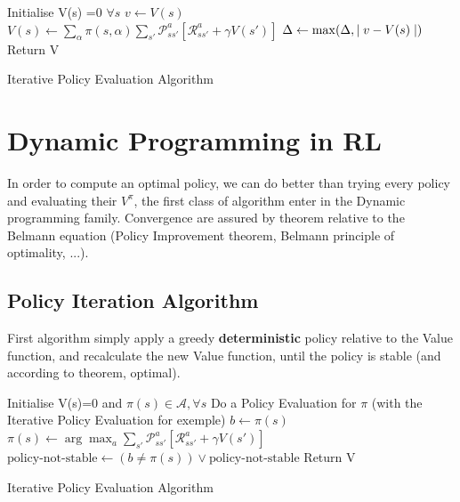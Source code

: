 		\begin{algorithm}[H]
				Initialise V(s) =0 $\forall s$ \;
				{
					{
						$v \leftarrow V(s)$ \;
						$V(s) \leftarrow \sum_\alpha \pi(s, \alpha) \sum_{s'} \mathcal{P}^a_{ss'}[\mathcal{R}^a_{ss'} + \gamma V(s')]$ \;
						$\Delta \leftarrow \max(\Delta, \mid v - V(s)\mid) $ 
					}
				}
				Return V
				\caption{Iterative Policy Evaluation Algorithm}
			\end{algorithm}


\section{Dynamic Programming in RL} %
	\label{sec:dynamic_programming_in_rl}

	In order to compute an optimal policy, we can do better than trying every policy and evaluating their $V^{\pi}$, the first class of algorithm enter in the Dynamic programming family. Convergence are assured by theorem relative to the Belmann equation (Policy Improvement theorem, Belmann principle of optimality, ...).
	\subsection{Policy Iteration Algorithm} %
		\label{sub:policy_iteration_algorithm}
		
		First algorithm simply apply a greedy \textbf{deterministic} policy relative to the Value function, and recalculate the new Value function, until the policy is stable (and according to theorem, optimal).


		\begin{algorithm}[H]
				Initialise V(s)=0 and $\pi(s) \in \mathcal{A},  \forall s$ \;
				{
					Do a Policy Evaluation for $\pi$ (with the Iterative Policy Evaluation for exemple)
					{
						$b \leftarrow \pi(s)$ \;
						$\pi(s) \leftarrow \arg \max_a \sum_{s'} \mathcal{P}^a_{ss'}[\mathcal{R}^a_{ss'} + \gamma V(s')]$ \;
						$\text{policy-not-stable} \leftarrow (b \neq \pi(s) )\vee \text{policy-not-stable} $ 
					}
				}
				Return V
				\caption{Iterative Policy Evaluation Algorithm}
			\end{algorithm}

